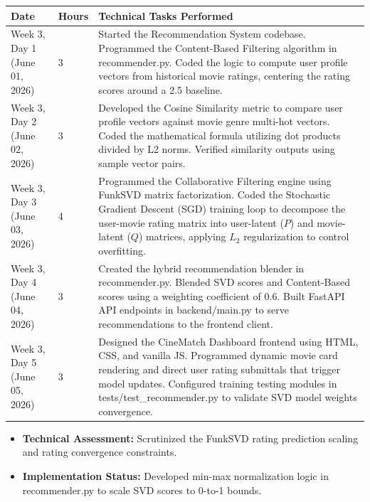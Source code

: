 \documentclass[11pt,a4paper]{article}
\begin{document}
\begin{longtable}{L{2.8cm} C{1.2cm} L{10.5cm}}
    \toprule
    \textbf{Date} & \textbf{Hours} & \textbf{Technical Tasks Performed} \\
    \midrule
    \endhead
    \bottomrule
    \endfoot
    \bottomrule
    \endlastfoot
    Week 3, Day 1 \newline (June 01, 2026) & 3 & Started the Recommendation System codebase. Programmed the Content-Based Filtering algorithm in recommender.py. Coded the logic to compute user profile vectors from historical movie ratings, centering the rating scores around a 2.5 baseline. \\
    \addlinespace
    Week 3, Day 2 \newline (June 02, 2026) & 3 & Developed the Cosine Similarity metric to compare user profile vectors against movie genre multi-hot vectors. Coded the mathematical formula utilizing dot products divided by L2 norms. Verified similarity outputs using sample vector pairs. \\
    \addlinespace
    Week 3, Day 3 \newline (June 03, 2026) & 4 & Programmed the Collaborative Filtering engine using FunkSVD matrix factorization. Coded the Stochastic Gradient Descent (SGD) training loop to decompose the user-movie rating matrix into user-latent ($P$) and movie-latent ($Q$) matrices, applying $L_2$ regularization to control overfitting. \\
    \addlinespace
    Week 3, Day 4 \newline (June 04, 2026) & 3 & Created the hybrid recommendation blender in recommender.py. Blended SVD scores and Content-Based scores using a weighting coefficient of 0.6. Built FastAPI API endpoints in backend/main.py to serve recommendations to the frontend client. \\
    \addlinespace
    Week 3, Day 5 \newline (June 05, 2026) & 3 & Designed the CineMatch Dashboard frontend using HTML, CSS, and vanilla JS. Programmed dynamic movie card rendering and direct user rating submittals that trigger model updates. Configured training testing modules in tests/test\_recommender.py to validate SVD model weights convergence. \\
\end{longtable}

\begin{tcolorbox}[colback=gray!5!white,colframe=gray!60!black,title=Weekly Review (Week 3)]
    \begin{itemize}
        \item \textbf{Technical Assessment:} Scrutinized the FunkSVD rating prediction scaling and rating convergence constraints.
        \item \textbf{Implementation Status:} Developed min-max normalization logic in recommender.py to scale SVD scores to 0-to-1 bounds.
    \end{itemize}
\end{tcolorbox}
\end{document}
